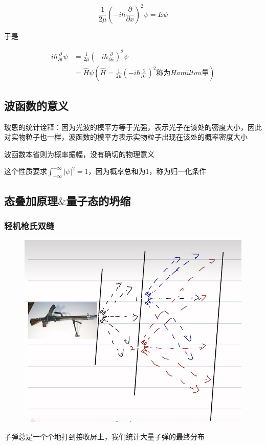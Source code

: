 \documentclass[lang=cn,10pt]{elegantbook}
\begin{document}
\begin{equation}
	\frac{1}{2\mu}\left( -i\hbar \frac{\partial}{\partial x} \right) ^2\psi =E\psi 
\end{equation}

于是

\begin{equation}
	\begin{split}
		i\hbar \frac{\partial}{\partial t}\psi &=\frac{1}{2\mu}\left( -i\hbar \frac{\partial}{\partial x} \right) ^2\psi 
		\\
		&=\hat{H}\psi \left( \hat{H}=\frac{1}{2\mu}\left( -i\hbar \frac{\partial}{\partial x} \right) ^2\text{称为}Hamilton\text{量} \right) 
	\end{split}
\end{equation}
\subsection{波函数的意义}
玻恩的统计诠释：因为光波的模平方等于光强，表示光子在该处的密度大小，因此对实物粒子也一样，波函数的模平方表示实物粒子出现在该处的概率密度大小

波函数本省则为概率振幅，没有确切的物理意义

这个性质要求$\int_{-\infty}^{+\infty}{|\psi |^2}=1$，因为概率总和为1，称为归一化条件
\subsection{态叠加原理$\&$量子态的坍缩}
\subsubsection{轻机枪氏双缝}
\begin{figure}[H]
	\centering
	\includegraphics[width=0.7\linewidth]{figure/screenshot004}
\end{figure}
子弹总是一个个地打到接收屏上，我们统计大量子弹的最终分布
\end{document}

